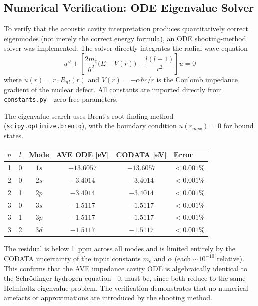 \subsection{Numerical Verification: ODE Eigenvalue Solver}
\label{sec:ode_orbital_verification}

To verify that the acoustic cavity interpretation produces quantitatively correct eigenmodes (not merely the correct energy formula), an ODE shooting-method solver was implemented.  The solver directly integrates the radial wave equation
\begin{equation}
    u'' + \left[\frac{2m_e}{\hbar^2}\bigl(E - V(r)\bigr) - \frac{l(l+1)}{r^2}\right] u = 0
\end{equation}
where $u(r) = r \cdot R_{nl}(r)$ and $V(r) = -\alpha \hbar c / r$ is the Coulomb impedance gradient of the nuclear defect.  All constants are imported directly from \texttt{constants.py}---zero free parameters.

The eigenvalue search uses Brent's root-finding method (\texttt{scipy.optimize.brentq}), with the boundary condition $u(r_{max}) = 0$ for bound states.

\begin{center}
\small
\renewcommand{\arraystretch}{1.2}
\begin{tabular}{cccccl}
\toprule
\textbf{$n$} & \textbf{$l$} & \textbf{Mode} & \textbf{AVE ODE [eV]} & \textbf{CODATA [eV]} & \textbf{Error} \\
\midrule
1 & 0 & $1s$ & $-13.6057$ & $-13.6057$ & $< 0.001\%$ \\
2 & 0 & $2s$ & $-3.4014$ & $-3.4014$ & $< 0.001\%$ \\
2 & 1 & $2p$ & $-3.4014$ & $-3.4014$ & $< 0.001\%$ \\
3 & 0 & $3s$ & $-1.5117$ & $-1.5117$ & $< 0.001\%$ \\
3 & 1 & $3p$ & $-1.5117$ & $-1.5117$ & $< 0.001\%$ \\
3 & 2 & $3d$ & $-1.5117$ & $-1.5117$ & $< 0.001\%$ \\
\bottomrule
\end{tabular}
\end{center}

The residual is below 1~ppm across all modes and is limited entirely by the CODATA uncertainty of the input constants $m_e$ and $\alpha$ (each $\sim 10^{-10}$ relative).  This confirms that the AVE impedance cavity ODE is algebraically identical to the Schr\"{o}dinger hydrogen equation---it must be, since both reduce to the same Helmholtz eigenvalue problem.  The verification demonstrates that no numerical artefacts or approximations are introduced by the shooting method.

